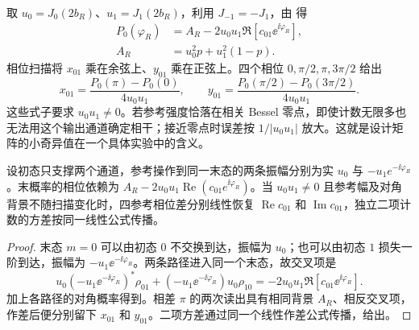 取 $u_0=J_0(2b_R)$、$u_1=J_1(2b_R)$，利用 $J_{-1}=-J_1$，由 得
\begin{equation}
 \begin{aligned}
 P_0(\varphi_R)&=A_R-2u_0u_1\Re[c_{01}\ee^{\ii\varphi_R}],\\
 A_R&=u_0^2p+u_1^2(1-p).
 \end{aligned}
 \label{eq:electron-reference-two-channel-fringe}
\end{equation}
相位扫描将 $x_{01}$ 乘在余弦上、$y_{01}$ 乘在正弦上。四个相位 $0,\pi/2,\pi,3\pi/2$ 给出
\begin{equation}
 x_{01}=\frac{P_0(\pi)-P_0(0)}{4u_0u_1},\qquad
 y_{01}=\frac{P_0(\pi/2)-P_0(3\pi/2)}{4u_0u_1}.
 \label{eq:electron-reference-four-phase-inversion}
\end{equation}
这些式子要求 $u_0u_1\neq0$。若参考强度恰落在相关 Bessel 零点，即使计数无限多也无法用这个输出通道确定相干；接近零点时误差按 $1/|u_0u_1|$ 放大。这就是设计矩阵的小奇异值在一个具体实验中的含义。

\begin{lemma}[两通道参考干涉的正交相干读出]
设初态只支撑两个通道，参考操作到同一末态的两条振幅分别为实 $u_0$ 与 $-u_1e^{-\ii\varphi_R}$。末概率的相位依赖为 $A_R-2u_0u_1\operatorname{Re}(c_{01}e^{\ii\varphi_R})$。当 $u_0u_1\ne0$ 且参考幅及对角背景不随扫描变化时，四参考相位差分别线性恢复 $\operatorname{Re}c_{01}$ 和 $\operatorname{Im}c_{01}$，独立二项计数的方差按同一线性公式传播。
\end{lemma}
\begin{proof}
末态 $m=0$ 可以由初态 $0$ 不交换到达，振幅为 $u_0$；也可以由初态 $1$ 损失一阶到达，振幅为 $-u_1\ee^{-\ii\varphi_R}$。两条路径进入同一个末态，故交叉项是
\begin{equation*}
 u_0(-u_1\ee^{-\ii\varphi_R})^*\rho_{01}
 +(-u_1\ee^{-\ii\varphi_R})u_0\rho_{10}
 =-2u_0u_1\Re[c_{01}\ee^{\ii\varphi_R}].
\end{equation*}
加上各路径的对角概率得到。相差 $\pi$ 的两次读出具有相同背景 $A_R$、相反交叉项，作差后便分别留下 $x_{01}$ 和 $y_{01}$。二项方差通过同一个线性作差公式传播，给出。
\end{proof}


